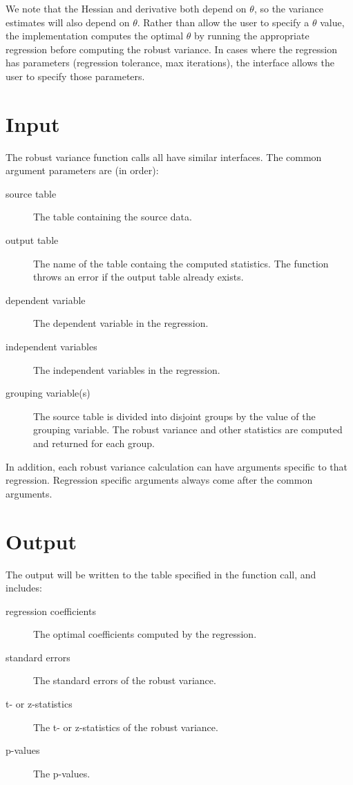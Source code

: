 \documentclass[12pt]{article}
\begin{document}
We note that the Hessian and derivative both depend on $\theta$, so the variance estimates will also depend on $\theta$.  Rather than allow the user to specify a $\theta$ value, the implementation computes the optimal $\theta$ by running the appropriate regression  before computing the robust variance.  In cases where the regression has parameters (regression tolerance, max iterations), the interface allows the user to specify those parameters.


\section{Input}
	The robust variance function calls all have similar interfaces.  The common argument parameters are (in order):
\begin{description}
\item [source table] The table containing the source data.  
\item [output table] The name of the table containg the computed statistics.  The function throws an error if the output table already exists. 
\item [dependent variable] The dependent variable in the regression.   
\item [independent variables]  The independent variables in the regression.    
\item [grouping variable(s)]  The source table is divided into disjoint groups by the value of the grouping variable.  The robust variance and other statistics are computed and returned for each group.  
\end{description}
	In addition, each robust variance calculation can have arguments specific to that regression.  Regression specific arguments  always come after the common arguments.  

\section{Output}
	The output will be written to the table specified in the function call, and includes:
\begin{description}
\item [regression coefficients] The optimal coefficients computed by the regression.  
\item [standard errors] The standard errors of the robust variance.
\item [t- or z-statistics] The t- or z-statistics of the robust variance.   
\item [p-values]  The p-values.      
\end{description}

	
\end{document}
